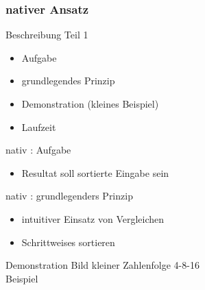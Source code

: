 \documentclass[ucs,9pt]{beamer}
\begin{document}
\subsubsection*{nativer Ansatz}
\begin{frame}{Beschreibung Teil 1}
\begin{itemize}
\item Aufgabe
\item grundlegendes Prinzip
\item Demonstration (kleines Beispiel)
\item Laufzeit
\end{itemize}
\end{frame}
\begin{frame}{nativ : Aufgabe}
\begin{itemize}
\item Resultat soll sortierte Eingabe sein
\end{itemize}
\end{frame}
\begin{frame}{nativ : grundlegenders Prinzip}
\begin{itemize}
\item intuitiver Einsatz von Vergleichen
\item Schrittweises sortieren
\end{itemize}
\end{frame}
\begin{frame}{Demonstration}
Bild kleiner Zahlenfolge 4-8-16\\
Beispiel
\end{frame}
\end{document}
